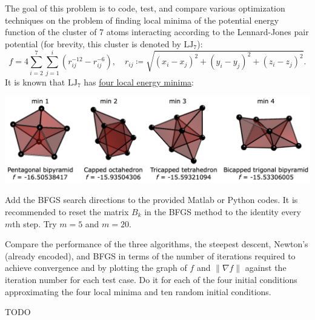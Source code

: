 \documentclass{../kin_math}
\begin{document}
\begin{questions}
  \question The goal of this problem is to code, test, and compare various optimization techniques on the problem of finding local minima of the potential energy function of the cluster of 7 atoms interacting according to the Lennard-Jones pair potential (for brevity, this cluster is denoted by $\text{LJ}_7$):
  \begin{equation}
    f = 4 \sum_{i = 2}^7 \sum_{j = 1}^i \left(r_{ij}^{-12} - r_{ij}^{-6}\right), \quad r_{ij} \coloneqq \sqrt{(x_i - x_j)^2 + (y_i - y_j)^2 + (z_i - z_j)^2}.
  \end{equation}
  It is known that $\text{LJ}_7$ has \href{https://doi.org/10.1063/1.475008}{four local energy minima}:
  \begin{center}
    \includegraphics[scale=0.25]{minima.png}
  \end{center}
  Add the BFGS search directions to the provided Matlab or Python codes. It is recommended to reset the matrix $B_k$ in the BFGS method to the identity every $m$th step. Try $m = 5$ and $m = 20$.

  Compare the performance of the three algorithms, the steepest descent, Newton's (already encoded), and BFGS in terms of the number of iterations required to achieve convergence and by plotting the graph of $f$ and $\lVert \nabla f \rVert$ against the iteration number for each test case. Do it for each of the four initial conditions approximating the four local minima and ten random initial conditions.
  \begin{solution}
    TODO
  \end{solution}


\end{questions}
\end{document}
